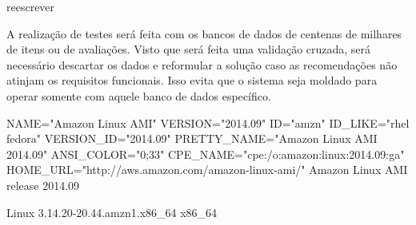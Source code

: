 reescrever

A realização de testes será feita com os bancos de dados de centenas de milhares de itens ou de avaliações. Visto que será feita uma validação cruzada, será necessário descartar os dados e reformular a solução caso as recomendações não atinjam os requisitos funcionais. Isso evita que o sistema seja moldado para operar somente com aquele banco de dados específico.






NAME="Amazon Linux AMI"
VERSION="2014.09"
ID="amzn"
ID_LIKE="rhel fedora"
VERSION_ID="2014.09"
PRETTY_NAME="Amazon Linux AMI 2014.09"
ANSI_COLOR="0;33"
CPE_NAME="cpe:/o:amazon:linux:2014.09:ga"
HOME_URL="http://aws.amazon.com/amazon-linux-ami/"
Amazon Linux AMI release 2014.09

Linux 3.14.20-20.44.amzn1.x86_64 x86_64
